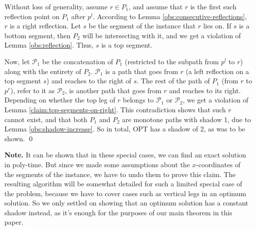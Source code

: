 \documentclass[pdflatex,sn-mathphys-num]{sn-jnl}
\theoremstyle{thmstyleone}
\newcommand{\OPT}{{\text{OPT}}}
\begin{document}
	Without loss of generality, assume $ r \in P_1 $, and assume that $ r $ is the first such reflection point on $ P_1 $ after $ p^l $. According to Lemma \ref{obs:consecutive-reflections}, $ r $ is a right reflection. Let $ s $ be the segment of the instance that $ r $ lies on. If $ s $ is a bottom segment, then $ P_2 $ will be intersecting with it, and we get a violation of Lemma \ref{obs:reflection}. Thus, $ s $ is a top segment.
	
	Now, let $ \mathcal P_1 $ be the concatenation of $ P_1 $ (restricted to the subpath from $ p^l $ to $ r $) along with the entirety of $ P_2 $. $ \mathcal P_1 $ is a path that goes from $ r $ (a left reflection on a top segment $ s $) and reaches to the right of $ s $. The rest of the path of $ P_1 $ (from $ r $ to $ p^r $), refer to it as $ \mathcal P_2 $, is another path that goes from $ r $ and reaches to its right. Depending on whether the top leg of $ r $ belongs to $ \mathcal P_1 $ or $ \mathcal P_2 $, we get a violation of Lemma \ref{claim:top-segments-on-right}. This contradiction shows that such $ r $ cannot exist, and that both $ P_1 $ and $ P_2 $ are monotone paths with shadow 1, due to Lemma \ref{obs:shadow-increase}. So in total, $ \OPT $ has a shadow of 2, as was to be shown. 
    \qed

    \vspace{.5cm}
    \noindent \textbf{Note.} It can be shown that in these special cases, we can find an exact solution in poly-time. But since we made some assumptions about the $ x $-coordinates of the segments of the instance, we have to undo them to prove this claim. The resulting algorithm will be somewhat detailed for such a limited special case of the problem, because we have to cover cases such as vertical legs in an optimum solution. So we only settled on showing that an optimum solution has a constant shadow instead, as it's enough for the purposes of our main theorem in this paper.
\end{document}
